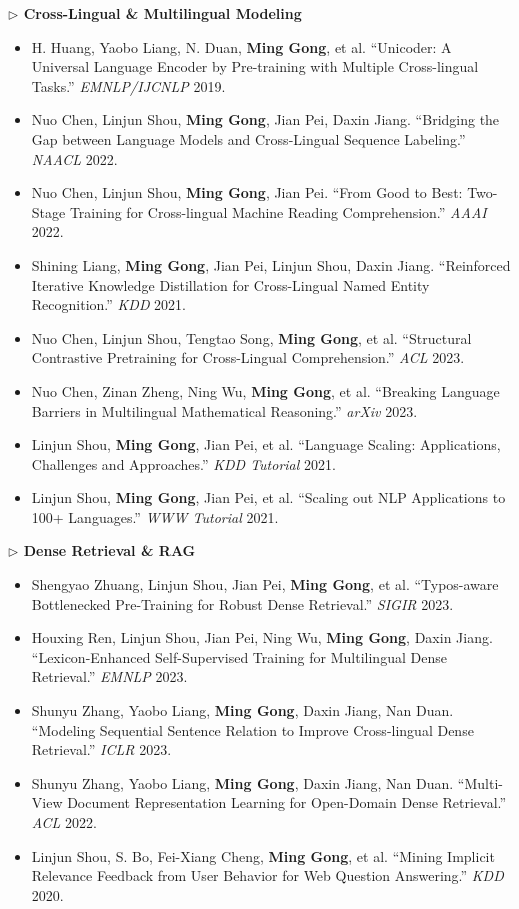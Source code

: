 \documentclass[10.5pt,letterpaper]{article}
\begin{document}
\noindent\textcolor{blue!60!black}{\textbf{$\triangleright$ Cross-Lingual \& Multilingual Modeling}}
\begin{itemize}
  \item H. Huang, Yaobo Liang, N. Duan, \textbf{Ming Gong}, et al. ``Unicoder: A Universal Language Encoder by Pre-training with Multiple Cross-lingual Tasks.'' \textit{EMNLP/IJCNLP} 2019.
  \item Nuo Chen, Linjun Shou, \textbf{Ming Gong}, Jian Pei, Daxin Jiang. ``Bridging the Gap between Language Models and Cross-Lingual Sequence Labeling.'' \textit{NAACL} 2022.
  \item Nuo Chen, Linjun Shou, \textbf{Ming Gong}, Jian Pei. ``From Good to Best: Two-Stage Training for Cross-lingual Machine Reading Comprehension.'' \textit{AAAI} 2022.
  \item Shining Liang, \textbf{Ming Gong}, Jian Pei, Linjun Shou, Daxin Jiang. ``Reinforced Iterative Knowledge Distillation for Cross-Lingual Named Entity Recognition.'' \textit{KDD} 2021.
  \item Nuo Chen, Linjun Shou, Tengtao Song, \textbf{Ming Gong}, et al. ``Structural Contrastive Pretraining for Cross-Lingual Comprehension.'' \textit{ACL} 2023.
  \item Nuo Chen, Zinan Zheng, Ning Wu, \textbf{Ming Gong}, et al. ``Breaking Language Barriers in Multilingual Mathematical Reasoning.'' \textit{arXiv} 2023.
  \item Linjun Shou, \textbf{Ming Gong}, Jian Pei, et al. ``Language Scaling: Applications, Challenges and Approaches.'' \textit{KDD Tutorial} 2021.
  \item Linjun Shou, \textbf{Ming Gong}, Jian Pei, et al. ``Scaling out NLP Applications to 100+ Languages.'' \textit{WWW Tutorial} 2021.
\end{itemize}

\noindent\textcolor{blue!60!black}{\textbf{$\triangleright$ Dense Retrieval \& RAG}}
\begin{itemize}
  \item Shengyao Zhuang, Linjun Shou, Jian Pei, \textbf{Ming Gong}, et al. ``Typos-aware Bottlenecked Pre-Training for Robust Dense Retrieval.'' \textit{SIGIR} 2023.
  \item Houxing Ren, Linjun Shou, Jian Pei, Ning Wu, \textbf{Ming Gong}, Daxin Jiang. ``Lexicon-Enhanced Self-Supervised Training for Multilingual Dense Retrieval.'' \textit{EMNLP} 2023.
  \item Shunyu Zhang, Yaobo Liang, \textbf{Ming Gong}, Daxin Jiang, Nan Duan. ``Modeling Sequential Sentence Relation to Improve Cross-lingual Dense Retrieval.'' \textit{ICLR} 2023.
  \item Shunyu Zhang, Yaobo Liang, \textbf{Ming Gong}, Daxin Jiang, Nan Duan. ``Multi-View Document Representation Learning for Open-Domain Dense Retrieval.'' \textit{ACL} 2022.
  \item Linjun Shou, S. Bo, Fei-Xiang Cheng, \textbf{Ming Gong}, et al. ``Mining Implicit Relevance Feedback from User Behavior for Web Question Answering.'' \textit{KDD} 2020.
\end{itemize}
\end{document}
